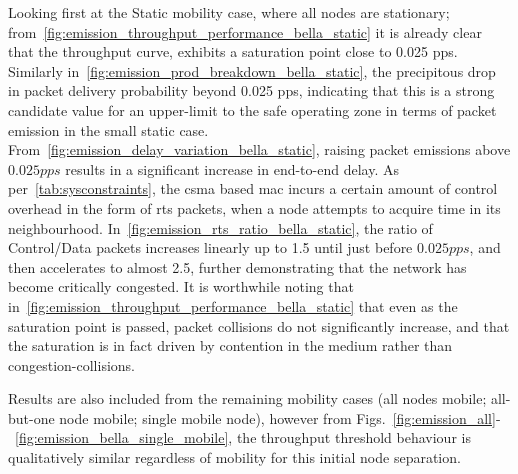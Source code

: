 Looking first at the Static mobility case, where all nodes are stationary; from~\autoref{fig:emission_throughput_performance_bella_static} it is already clear that the throughput curve, exhibits a saturation point close to 0.025 pps.
Similarly in~\autoref{fig:emission_prod_breakdown_bella_static}, the precipitous drop in packet delivery probability beyond 0.025 pps, indicating that this is a strong candidate value for an upper-limit to the safe operating zone in terms of packet emission in the small static case.
From~\autoref{fig:emission_delay_variation_bella_static}, raising packet emissions above $0.025pps$ results in a significant increase in end-to-end delay.
As per~\autoref{tab:sysconstraints}, the \gls{csma} based \gls{mac} incurs a certain amount of control overhead in the form of \gls{rts} packets, when a node attempts to acquire time in its neighbourhood.
In~\autoref{fig:emission_rts_ratio_bella_static}, the ratio of Control/Data packets increases linearly up to 1.5 until just before $0.025pps$, and then accelerates to almost 2.5, further demonstrating that the network has become critically congested.
It is worthwhile noting that in~\autoref{fig:emission_throughput_performance_bella_static} that even as the saturation point is passed, packet collisions do not significantly increase, and that the saturation is in fact driven by contention in the medium rather than congestion-collisions.

Results are also included from the remaining mobility cases (all nodes mobile; all-but-one node mobile; single mobile node), however from Figs.~\ref{fig:emission_all}-~\ref{fig:emission_bella_single_mobile}, the throughput threshold behaviour is qualitatively similar regardless of mobility for this initial node separation.

